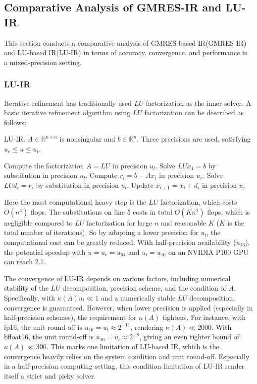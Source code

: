 \subsection{Comparative Analysis of GMRES-IR and LU-IR}
\label{subsec:comparison}

This section conducts a comparative analysis of GMRES-based IR(GMRES-IR) and LU-based IR(LU-IR) in terms of accuracy, convergence, and performance in a mixed-precision setting.
\subsubsection{LU-IR}
Iterative refinement has traditionally used $LU$ factorization as the inner solver. A basic iterative refinement algorithm using $LU$ factorization can be described as follows:

\begin{algorithm}
    \caption{LU-IR. $A \in \mathbb{R}^{n \times n}$ is nonsingular and $b \in \mathbb{R}^n$. Three precisions are used, satisfying $u_r \leq u \leq u_l$.}
    \begin{algorithmic}[1]
        \State Compute the factorization $A = LU$ in precision $u_l$.
        \State Solve $LUx_1 = b$ by substitution in precision $u_l$.
            \State Compute $r_i = b - Ax_i$ in precision $u_r$.
            \State Solve $LUd_i = r_i$ by substitution in precision $u_l$.
            \State Update $x_{i+1} = x_i + d_i$ in precision $u$.
        \EndFor
    \end{algorithmic}
\end{algorithm}

Here the most computational heavy step is the $LU$ factorization, which costs $O(n^3)$ flops. The substitutions on line 5 costs in total $O(Kn^2)$ flops, which is negligible compared to $LU$ factorization for large $n$ and reasonable $K$ ($K$ is the total number of iterations). So by adopting a lower precision for $u_l$, the computational cost can be greatly reduced. With half-precision availability ($u_{16}$), the potential speedup with $u=u_r=u_{64}$ and $u_l=u_{16}$ on an NVIDIA P100 GPU can reach 2.7\cite{Haidar2017}. 

The convergence of LU-IR depends on various factors, including numerical stability of the $LU$ decomposition, precision scheme, and the condition of $A$. Specifically, with $\kappa(A)u_l \ll 1$ and a numerically stable $LU$ decomposition, convergence is guaranteed. However, when lower precision is applied (especially in half-precision schemes), the requirement for $\kappa(A)$ tightens. For instance, with fp16, the unit round-off is $u_{16}=u_l\approx 2^{-11}$, rendering $\kappa(A)\ll 2000$. With bfloat16, the unit round-off is $u_{16}=u_l\approx 2^{-8}$, giving an even tighter bound of$\kappa(A)\ll 300$. This marks one limitation of LU-based IR, which is the convergence heavily relies on the system condition and unit round-off. Especially in a half-precision computing setting, this condition limitation of LU-IR render itself a strict and picky solver.

